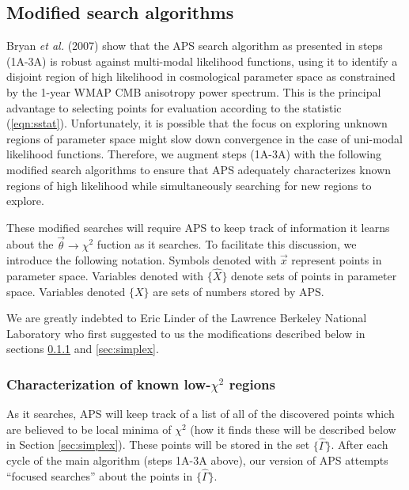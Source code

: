 \documentclass[useAMS,usenatbib]{aastex}
\begin{document}
\subsection{Modified search algorithms}

Bryan {\it et al.} (2007) show that the APS search algorithm as presented in steps (1A-3A)
is robust against multi-modal
likelihood functions, using it to identify a disjoint region of high likelihood in
cosmological parameter space as constrained by the 1-year WMAP CMB anisotropy power
spectrum.  This is the principal advantage to selecting points for evaluation according
to the statistic (\ref{eqn:sstat}).  Unfortunately, it is possible that the focus on 
exploring
unknown regions of parameter space might slow down convergence in the case of uni-modal
likelihood functions.  Therefore, we augment steps (1A-3A) with
the following modified search algorithms
to ensure that APS adequately characterizes known regions of high likelihood while
simultaneously searching for new regions to explore.

These modified searches will require APS to keep track of information it learns about the
$\vec{\theta}\rightarrow\chi^2$ fuction as it searches.  
To facilitate this discussion, we introduce the following notation.
Symbols denoted with $\vec{x}$ represent points in parameter space.  Variables denoted with
$\{\hat{X}\}$ denote sets of points in parameter space.  Variables denoted $\{X\}$ are sets
of numbers stored by APS.

We are greatly indebted to Eric Linder of the Lawrence Berkeley National
Laboratory who first suggested to us the modifications described below
in sections \ref{sec:focus} and \ref{sec:simplex}.

\subsubsection{Characterization of known low-$\chi^2$ regions}
\label{sec:focus}

As it searches, APS will keep track of a list of all of the discovered points
which are believed to be local minima of $\chi^2$ 
(how it finds these will be described below
in Section \ref{sec:simplex}).  These points will be stored in the set
$\{\hat{\Gamma}\}$.  After each cycle of the main algorithm (steps 1A-3A above),
our version of APS attempts ``focused searches'' about the points in $\{\hat{\Gamma}\}$.  
\end{document}
